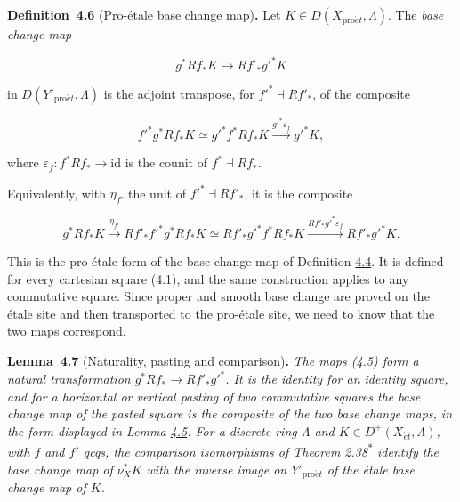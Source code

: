 \documentclass[11pt]{article}
\newenvironment{bpstatement}[2]{\par\addvspace{0.6\baselineskip}\noindent\textbf{#1}#2\textbf{.}\enspace\ignorespaces}
  {\par\addvspace{0.4\baselineskip}}
\newenvironment{bpstatementit}[2]{\begin{bpstatement}{#1}{#2}\itshape\ignorespaces}{\end{bpstatement}}
\newcommand{\bpout}[1]{#1\textsuperscript{\hyperlink{bp-outside}{\ensuremath{\ast}}}}
\begin{document}
\label{bp18}%
\begin{bpstatement}{Definition~4.6}{ (Pro-étale base change map)}
Let \(K\in D(X_{\mathrm{pro}\acute{e}t},\Lambda)\). The \emph{base change map}

\[
g^*Rf_*K\longrightarrow Rf'_*g'^*K
\tag{4.5}
\]

in \(D(Y'_{\mathrm{pro}\acute{e}t},\Lambda)\) is the adjoint transpose, for \(f'^*\dashv Rf'_*\), of the composite

\[
f'^*g^*Rf_*K\simeq g'^*f^*Rf_*K
\xrightarrow{g'^*\varepsilon_f}g'^*K,
\]

where \(\varepsilon_f:f^*Rf_*\to\mathrm{id}\) is the counit of \(f^*\dashv Rf_*\).
\end{bpstatement}

\label{bp19}%
Equivalently, with \(\eta_{f'}\) the unit of \(f'^*\dashv Rf'_*\), it is the composite

\[
g^*Rf_*K\xrightarrow{\eta_{f'}}
Rf'_*f'^*g^*Rf_*K\simeq Rf'_*g'^*f^*Rf_*K
\xrightarrow{Rf'_*g'^*\varepsilon_f}Rf'_*g'^*K.
\]

This is the pro-étale form of the base change map of Definition \hyperref[bp13]{4.4}. It is defined for every cartesian square (4.1), and the same construction applies to any commutative square. Since proper and smooth base change are proved on the étale site and then transported to the pro-étale site, we need to know that the two maps correspond.

\label{bp20}%
\begin{bpstatementit}{Lemma~4.7}{ (Naturality, pasting and comparison)}
The maps (4.5) form a natural transformation \(g^*Rf_*\to Rf'_*g'^*\). It is the identity for an identity square, and for a horizontal or vertical pasting of two commutative squares the base change map of the pasted square is the composite of the two base change maps, in the form displayed in Lemma \hyperref[bp15]{4.5}. For a discrete ring \(\Lambda\) and \(K\in D^+(X_{\acute{e}t},\Lambda)\), with \(f\) and \(f'\) qcqs, the comparison isomorphisms of Theorem \bpout{2.38} identify the base change map of \(\nu_X^*K\) with the inverse image on \(Y'_{\mathrm{pro}\acute{e}t}\) of the étale base change map of \(K\).
\end{bpstatementit}
\end{document}
